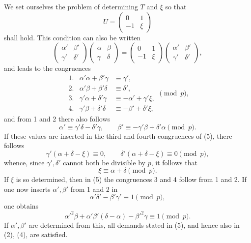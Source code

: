 \documentclass[11pt]{article}
\begin{document}
We set ourselves the problem of determining $T$ and $\xi$ so that
\begin{equation}
 U=\begin{pmatrix}0&1\\-1&\xi\end{pmatrix}
\tag{4}
\end{equation}
shall hold. This condition can also be written
\[
 \begin{pmatrix}\alpha'&\beta'\\\gamma'&\delta'\end{pmatrix}
 \begin{pmatrix}\alpha&\beta\\\gamma&\delta\end{pmatrix}
 =
 \begin{pmatrix}0&1\\-1&\xi\end{pmatrix}
 \begin{pmatrix}\alpha'&\beta'\\\gamma'&\delta'\end{pmatrix},
\]
and leads to the congruences
\begin{equation}
\begin{array}{rcl}
1.&\alpha'\alpha+\beta'\gamma&\equiv\gamma',\\
2.&\alpha'\beta+\beta'\delta&\equiv\delta',\\
3.&\gamma'\alpha+\delta'\gamma&\equiv-\alpha'+\gamma'\xi,\\
4.&\gamma'\beta+\delta'\delta&\equiv-\beta'+\delta'\xi,
\end{array}\pmod p,
\tag{5}
\end{equation}
and from 1 and 2 there also follows
\begin{equation}
 \alpha'\equiv\gamma'\delta-\delta'\gamma,
 \qquad
 \beta'\equiv-\gamma'\beta+\delta'\alpha\pmod p.
\tag{6}
\end{equation}
If these values are inserted in the third and fourth congruences of (5), there follows
\[
 \gamma'(\alpha+\delta-\xi)\equiv0,
 \qquad
 \delta'(\alpha+\delta-\xi)\equiv0\pmod p,
\]
whence, since $\gamma',\delta'$ cannot both be divisible by $p$, it follows that
\begin{equation}
 \xi\equiv\alpha+
\delta\pmod p.
\tag{7}
\end{equation}
If $\xi$ is so determined, then in (5) the congruences 3 and 4 follow from 1 and 2. If one now inserts $\alpha',\beta'$ from 1 and 2 in
\begin{equation}
 \alpha'\delta'-\beta'\gamma'\equiv1\pmod p,
\tag{8}
\end{equation}
one obtains
\begin{equation}
 \alpha'^2\beta+\alpha'\beta'(\delta-\alpha)-\beta'^2\gamma\equiv1\pmod p.
\tag{9}
\end{equation}
If $\alpha',\beta'$ are determined from this, all demands stated in (5), and hence also in (2), (4), are satisfied.
\end{document}
